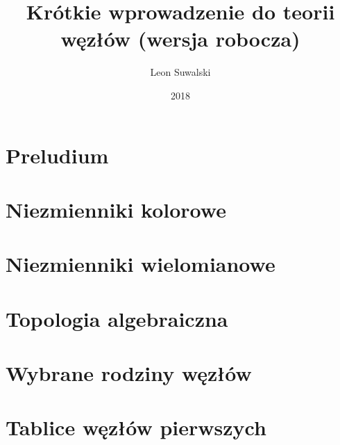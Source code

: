 \documentclass{createspace}
\author{Leon Suwalski}
\title{Krótkie wprowadzenie do teorii węzłów (wersja robocza)}
\date{2018}
\begin{document}
\maketitle
\tableofcontents
\chapter{Preludium}
\label{cha:preludium}






\chapter{Niezmienniki kolorowe}




\chapter{Niezmienniki wielomianowe}








\chapter{Topologia algebraiczna}





\chapter{Wybrane rodziny węzłów}









\chapter{Tablice węzłów pierwszych}



\raggedright

%


\newpage
{}
\end{document}
